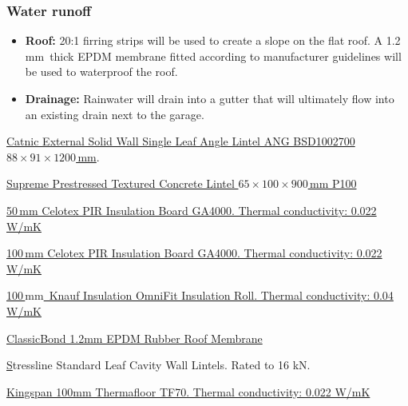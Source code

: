 \documentclass{extension}
\newcommand{\mm}{\,$\mathrm{mm}$}
\begin{document}
\subsubsection{Water runoff}
\begin{itemize}
  \item {\bf Roof:} 20:1 firring strips will be used to create a slope on the flat roof. A 1.2\mm\ thick EPDM membrane\cite{prmem} fitted according to manufacturer guidelines will be used to waterproof the roof.
  \item {\bf Drainage:} Rainwater will drain into a gutter that will ultimately flow into an existing drain next to the garage.
\end{itemize}

\begin{thebibliography}{9}
 \href{https://www.travisperkins.co.uk/steel-lintels/catnic-external-solid-wall-single-leaf-angle-lintel-1200mm-ang1200/p/270812}{Catnic External Solid Wall Single Leaf Angle Lintel ANG BSD1002700 $88\times91\times1200$\,mm}.

 \href{https://www.travisperkins.co.uk/concrete-lintels/supreme-prestressed-textured-concrete-lintel-65mm-x-100mm-x-900mm-p100/p/700507}{Supreme Prestressed Textured Concrete Lintel $65\times100\times900$\,mm P100}

 \href{https://www.travisperkins.co.uk/insulation-board/50mm-x-2400mm-x-1200mm-celotex-pir-insulation-board-ga4000/p/778040}{50\,mm Celotex PIR Insulation Board GA4000. Thermal conductivity: 0.022 W/mK}

 \href{https://www.travisperkins.co.uk/insulation-board/100mm-x-2400mm-x-1200mm-celotex-pir-insulation-board-ga4000/p/778048}{100\,mm Celotex PIR Insulation Board GA4000. Thermal conductivity: 0.022 W/mK}

 \href{https://www.travisperkins.co.uk/loft-insulation/knauf-insulation-omnifit-insulation-roll-6860mm-x-1200mm-x-100mm/p/734020}{100\mm\ Knauf Insulation OmniFit Insulation Roll. Thermal conductivity: 0.04 W/mK}

 \href{https://www.rubber4roofs.co.uk/classicbond-one-piece-epdm-rubber-roof-covering-1-20mm}{ClassicBond 1.2mm EPDM Rubber Roof Membrane}

 \href{https://www.stressline.net/wp-content/uploads/2022/04/Stressline_Lintel_Guide_Feb2022_download.pdf} Stressline Standard Leaf Cavity Wall Lintels. Rated to 16 kN.

 \href{https://www.kingspan.com/gb/en/products/insulation-boards/floor-insulation-boards/thermafloor-tf70/}{Kingspan 100mm Thermafloor TF70. Thermal conductivity: 0.022 W/mK}


\end{thebibliography}
\end{document}
